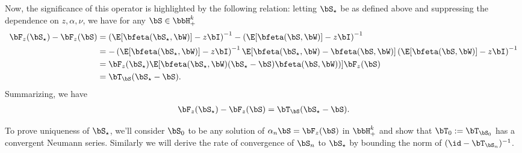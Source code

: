 Now, the significance of this operator is highlighted by the following relation: 
letting $\bS_\star$ be as defined above and suppressing the dependence on $z,\alpha,\nu$,
we have for any $\bS \in \bbH_+^k$
\begin{align*}
   \bF_z(\bS_\star) - \bF_z(\bS) &=
        \left(\E[\bfeta(\bS_\star,\bW)] - z\bI\right)^{-1}
        -
        \left(\E[\bfeta(\bS, \bW)] - z\bI\right)^{-1}\\
        &=
        -\left(\E[\bfeta(\bS_\star,\bW)] - z\bI\right)^{-1}
      \E[\bfeta(\bS_\star, \bW) - 
      \bfeta(\bS,\bW)] 
        \left(\E[\bfeta(\bS, \bW)] - z\bI\right)^{-1}\\
        &=
        \bF_z(\bS_\star) 
      \E[\bfeta(\bS_\star, \bW)(\bS_\star - \bS) 
      \bfeta(\bS,\bW))] 
     \bF_z(\bS) \\
   &=\bT_{\bS}(\bS_\star - \bS).
\end{align*}
Summarizing, we have
\begin{align}
\label{eq:relation_F_T}
   \bF_z(\bS_\star) - \bF_z(\bS) =\bT_{\bS}(\bS_\star - \bS).
\end{align}

To prove uniqueness of $\bS_\star$, we'll consider $\bS_0$ to be any solution of $\alpha_n \bS = \bF_z(\bS)$ in $\bbH_+^k$ and show that $\bT_0 := \bT_{\bS_0}$ has a convergent Neumann series. 
Similarly we will derive the rate of convergence of $\bS_n$ to $\bS_\star$ by bounding the norm of $(\id - \bT_{\bS_n})^{-1}$.


